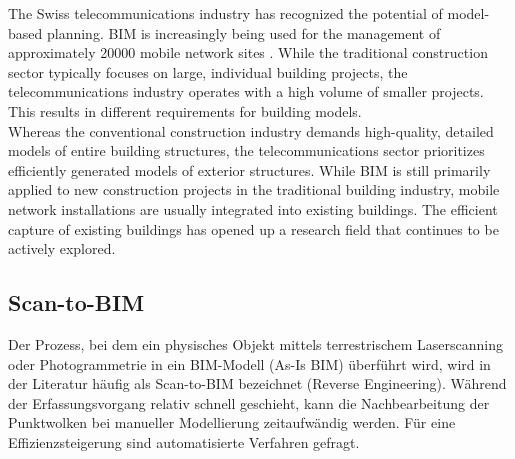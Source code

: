 \begin{English}
    The Swiss telecommunications industry has recognized the potential of model-based planning. BIM is increasingly being used for the management of approximately 20000 mobile network sites \cite{federalofficeofcommunicationsofcomLocationsMobilePhone}. While the traditional construction sector typically focuses on large, individual building projects, the telecommunications industry operates with a high volume of smaller projects. This results in different requirements for building models. \\
    Whereas the conventional construction industry demands high-quality, detailed models of entire building structures, the telecommunications sector prioritizes efficiently generated models of exterior structures. While BIM is still primarily applied to new construction projects in the traditional building industry, mobile network installations are usually integrated into existing buildings. The efficient capture of existing buildings has opened up a research field that continues to be actively explored.
\end{English}

\begin{comment}
Der prozess, bei dem ein physisches objekt mittels terrestrischem laserscanning oder photogrammetrie in ein bim modell (as-is BIM) überführt wird, wird in der literatur häufig als scan-to-BIM bezeichnet (reverse engineering). während der erfassungsvorgang relativ schnell geschieht, kann die nachbearbeitung der punktwolken bei manueller modellierung zeitaufwändig werden. für eine effizienzsteigerung sind automatisierte verfahren gefragt.
\end{comment}

\subsection{Scan-to-BIM}

\begin{German}
    Der Prozess, bei dem ein physisches Objekt mittels terrestrischem Laserscanning oder Photogrammetrie in ein BIM-Modell (As-Is BIM) überführt wird, wird in der Literatur häufig als Scan-to-BIM bezeichnet (Reverse Engineering). Während der Erfassungsvorgang relativ schnell geschieht, kann die Nachbearbeitung der Punktwolken bei manueller Modellierung zeitaufwändig werden. Für eine Effizienzsteigerung sind automatisierte Verfahren gefragt.
\end{German}

